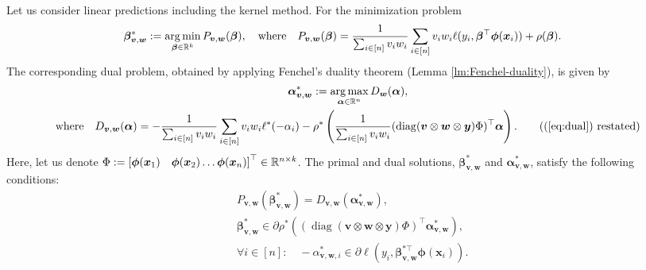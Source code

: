 \begin{lemma} \label{lm:dual-WRERM}
	Let us consider linear predictions including the kernel method. For the minimization problem
	\begin{align*}
	& \bm\beta_{\bm v, \bm w}^* := \operatorname*{arg\,min}_{\bm\beta\in\mathbb{R}^k} P_{\bm v, \bm w}(\bm\beta), \nonumber
		\quad
		\text{where}
		\quad
		P_{\bm v, \bm w}(\bm\beta) = \frac{1}{\sum_{i\in[n]} v_i w_i}\sum_{i\in[n]} v_i w_i \ell(y_i, \bm{\beta}^\top \bm\phi(\bm{x}_i)) + \rho(\bm\beta).
	\end{align*}
	The corresponding dual problem, obtained by applying Fenchel's duality theorem (Lemma \ref{lm:Fenchel-duality}), is given by
	\begin{gather}
		\bm\alpha_{\bm v, \bm w}^* := \argmax_{\bm\alpha\in\mathbb{R}^n} D_{\bm w}(\bm\alpha), \nonumber \\
		\text{where} \quad
		D_{\bm v,\bm w}(\bm\alpha) = - \frac{1}{\sum_{i\in[n]} v_i w_i}\sum_{i\in[n]} v_i w_i \ell^*(-\alpha_i) - \rho^*\left(\frac{1}{\sum_{i\in[n]} v_i w_i}(\operatorname{diag}(\bm v\otimes\bm w \otimes \bm y) \Phi)^\top\bm\alpha \right).
		\tag{(\ref{eq:dual}) restated}
	\end{gather}
	Here, let us denote $\Phi:=\left[\bm\phi(\bm x_1)\quad\bm\phi(\bm x_2) \ldots \bm\phi(\bm x_n)\right]^{\top} \in \mathbb{R}^{n\times k}$.
	The primal and dual solutions, $\bm\beta_{\bm v, \bm w}^*$ and $\bm\alpha_{\bm v, \bm w}^*$, satisfy the following conditions:
	\begin{align*}
	& P_{\bm v, \bm w}(\bm\beta_{\bm v, \bm w}^*) = D_{\bm v, \bm w}(\bm\alpha_{\bm v, \bm w}^*), \\
	& \bm\beta_{\bm v, \bm w}^* \in \partial\rho^*((\operatorname{diag}(\bm v \otimes \bm w \otimes \bm y)\Phi)^\top \bm\alpha_{\bm v, \bm w}^*), \\
	& \forall i\in[n]:\quad -\alpha^*_{\bm v, \bm w, i} \in \partial\ell(y_i, \bm\beta_{\bm v, \bm w}^{* \top} \bm\phi(\bm{x}_i)).
	\end{align*}
	\end{lemma}
	
